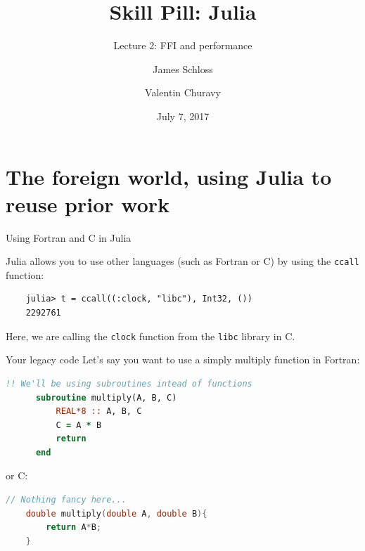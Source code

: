\documentclass{beamer}
\title[Skill Pill]{Skill Pill: Julia} %
\subtitle{Lecture 2: FFI and performance}
\author{James Schloss \and Valentin Churavy} %
\institute[OIST] %
{
Okinawa Institute of Science and Technology \\ %
\textit{james.schloss@oist.jp}\\
\textit{valentin.churavy@oist.jp} %
}
\date{July 7, 2017} %
\begin{document}

\begin{frame}
\vspace*{1.4cm}
\titlepage %
\end{frame}



\begin{frame}
  \tableofcontents
\end{frame}
\section{The foreign world, using Julia to reuse prior work}
\begin{frame}[fragile]{Using Fortran and C in Julia}

Julia allows you to use other languages (such as Fortran or C) by using the \texttt{ccall} function:

\begin{lstlisting}
    julia> t = ccall((:clock, "libc"), Int32, ())
    2292761
\end{lstlisting}

Here, we are calling the \texttt{clock} function from the \texttt{libc} library in C.

\end{frame}

\begin{frame}[fragile]{Your legacy code}
Let's say you want to use a simply multiply function in Fortran:
\begin{lstlisting}[language=fortran]
      !! We'll be using subroutines intead of functions 
      subroutine multiply(A, B, C)
          REAL*8 :: A, B, C
          C = A * B
          return
      end
\end{lstlisting}
\vspace{0.5cm}
or C:
\begin{lstlisting}[language=c]
    // Nothing fancy here...
    double multiply(double A, double B){
        return A*B;
    }
\end{lstlisting}
\end{frame}
\end{document}
